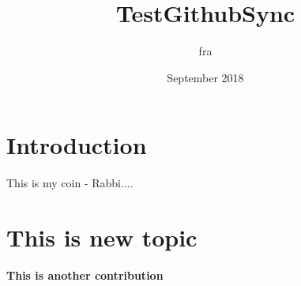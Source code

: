 \documentclass{article}
\title{TestGithubSync}
\author{fra }
\date{September 2018}
\begin{document}
\maketitle

\section{Introduction}

This is my coin - Rabbi....

\section{This is new topic}

\textbf{This is another contribution}
\end{document}
